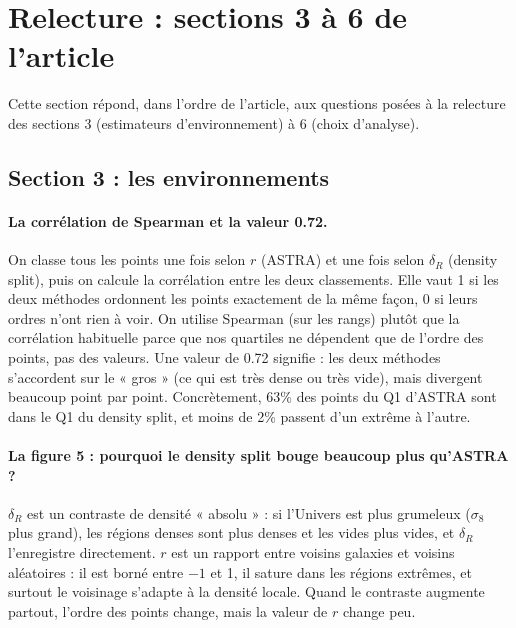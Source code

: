 \section{Relecture : sections 3 à 6 de l'article}

Cette section répond, dans l'ordre de l'article, aux questions posées à la relecture des sections 3 (estimateurs d'environnement) à 6 (choix d'analyse).

\subsection{Section 3 : les environnements}

\paragraph{La corrélation de Spearman et la valeur 0.72.} On classe tous les points une fois selon $r$ (ASTRA) et une fois selon $\delta_R$ (density split), puis on calcule la corrélation entre les deux classements. Elle vaut 1 si les deux méthodes ordonnent les points exactement de la même façon, 0 si leurs ordres n'ont rien à voir. On utilise Spearman (sur les rangs) plutôt que la corrélation habituelle parce que nos quartiles ne dépendent que de l'ordre des points, pas des valeurs. Une valeur de 0.72 signifie : les deux méthodes s'accordent sur le « gros » (ce qui est très dense ou très vide), mais divergent beaucoup point par point. Concrètement, 63\% des points du Q1 d'ASTRA sont dans le Q1 du density split, et moins de 2\% passent d'un extrême à l'autre.

\paragraph{La figure 5 : pourquoi le density split bouge beaucoup plus qu'ASTRA ?} $\delta_R$ est un contraste de densité « absolu » : si l'Univers est plus grumeleux ($\sigma_8$ plus grand), les régions denses sont plus denses et les vides plus vides, et $\delta_R$ l'enregistre directement. $r$ est un rapport entre voisins galaxies et voisins aléatoires : il est borné entre $-1$ et 1, il sature dans les régions extrêmes, et surtout le voisinage s'adapte à la densité locale. Quand le contraste augmente partout, l'ordre des points change, mais la valeur de $r$ change peu.

